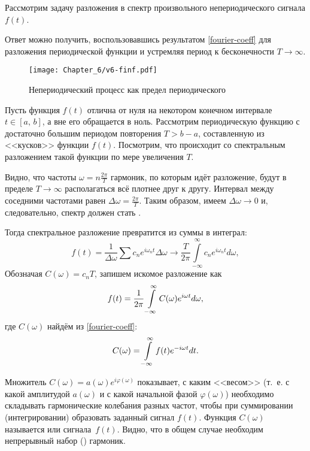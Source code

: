 Рассмотрим задачу разложения в спектр произвольного непериодического
сигнала $f(t)$.

Ответ можно получить, воспользовавшись результатом
\eqref{fourier-coeff} для разложения периодической функции
и устремляя период к бесконечности $T\to \infty$.

\begin{wrapfigure}[9]{o}{0.5\textwidth}
    \centering\texttt{[image: Chapter\_6/v6-finf.pdf]}
    \caption{Непериодический процесс как предел периодического}
\end{wrapfigure}

Пусть функция $f(t)$ отлична от нуля на некотором конечном интервале
$t\in[a,\,b]$, а вне его обращается в ноль. Рассмотрим периодическую функцию
с достаточно большим периодом повторения $T>b-a$, составленную из <<кусков>>
функции $f(t)$. Посмотрим, что происходит со спектральным разложением
такой функции по мере увеличения $T$.

Видно, что частоты $\omega = n \frac{2\pi}{T}$ гармоник, по которым идёт
разложение, будут в пределе $T\to \infty$ располагаться всё плотнее друг к другу.
Интервал между соседними частотами равен $\Delta \omega = \frac{2\pi}{T}$.
Таким образом, имеем $\Delta \omega\to 0$ и, следовательно,
спектр должен стать .

Тогда спектральное разложение превратится из суммы в интеграл:
\begin{equation*}
 f(t) = \frac{1}{\Delta \omega}\sum c_n e^{i\omega_n t} \Delta \omega \to
 \frac{T}{2\pi} \int\limits_{-\infty}^{\infty} c_n e^{i\omega_n t} d\omega,
\end{equation*}
Обозначая $C(\omega)=c_n T$, запишем искомое разложение как
\begin{equation}
\eqmark{Fourier integral}
f(t) = \frac{1}{2\pi} \int\limits_{-\infty}^{\infty} C(\omega) e^{i\omega t} d\omega,
\end{equation}
где $C(\omega)$ найдём из \eqref{fourier-coeff}:
\begin{equation}
\eqmark{Fourier integral-coef}
 C(\omega) =
\int\limits_{-\infty}^{\infty} f(t) e^{-i\omega t} dt.
\end{equation}

Множитель $C(\omega)=a(\omega)e^{i\varphi(\omega)}$ показывает, с каким
<<весом>> (т.~е. с какой амплитудой $a(\omega)$ и с какой начальной фазой
$\varphi(\omega)$) необходимо складывать гармонические
колебания разных частот, чтобы при суммировании (интегрировании) образовать
заданный сигнал $f(t)$. Функция $C(\omega)$ называется 
или  сигнала~$f(t)$.
Видно, что в общем случае необходим непрерывный набор () гармоник.

